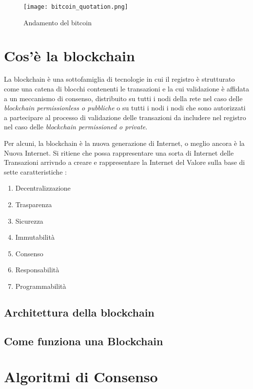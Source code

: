 \begin{figure}[htbp]
  \centering
  \texttt{[image: bitcoin\_quotation.png]}
  \caption{Andamento del bitcoin}
  \label{fig:bitcoin_quotation}
\end{figure}

\section{Cos'è la blockchain}
La blockchain è una sottofamiglia di tecnologie in cui il registro è strutturato come una catena di blocchi contenenti le transazioni e la cui validazione è affidata a un meccanismo di consenso, distribuito su tutti i nodi della rete nel caso delle \textit{blockchain permissionless o pubbliche} o su tutti i nodi i nodi che sono autorizzati a partecipare al processo di validazione delle transazioni da includere nel registro nel caso delle \textit{blockchain permissioned o private}.

Per alcuni, la blockchain è la nuova generazione di Internet, o meglio ancora è la Nuova Internet. Si ritiene che possa rappresentare una sorta di Internet delle Transazioni arrivndo a creare e rappresentare la Internet del Valore sulla base di sette caratteristiche \cite{bellini_2021}:
\begin{enumerate}
  \item Decentralizzazione
  \item Trasparenza
  \item Sicurezza
  \item Immutabilità
  \item Consenso
  \item Responsabilità
  \item Programmabilità
\end{enumerate}

\subsection{Architettura della blockchain}

\subsection{Come funziona una Blockchain}

\section{Algoritmi di Consenso}

